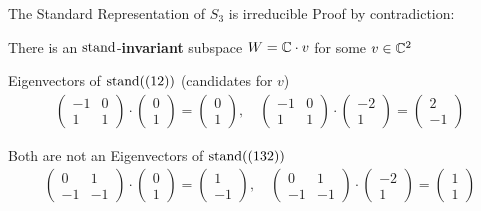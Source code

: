 \begin{frame}{The Standard Representation of $S_3$ is irreducible}
    \large
    Proof by contradiction:

    There is an $\operatorname{stand}$-\textbf{invariant} subspace $W = \mathbb{C} \cdot v$ for some $v \in \mathbb{C}^2$

    \pause
    Eigenvectors of $\operatorname{stand}((12))$ (candidates for $v$)
    \begin{align*}
        \begin{pmatrix}
            -1 & 0 \\
            1 & 1
        \end{pmatrix} \cdot \begin{pmatrix}
            0 \\ 1
        \end{pmatrix} = \begin{pmatrix}
            0 \\ 1
        \end{pmatrix}, \quad \begin{pmatrix}
            -1 & 0 \\
            1 & 1
        \end{pmatrix} \cdot \begin{pmatrix}
            -2 \\ 1
        \end{pmatrix} = \begin{pmatrix}
            2 \\ -1
        \end{pmatrix}
    \end{align*}
    
    \pause
    Both are not an Eigenvectors of $\operatorname{stand}((132))$
    \begin{align*}
        \begin{pmatrix}
            0 & 1 \\
            -1 & -1
        \end{pmatrix} \cdot \begin{pmatrix}
            0 \\ 1
        \end{pmatrix} = \begin{pmatrix}
            1 \\ -1
        \end{pmatrix}, \quad \begin{pmatrix}
            0 & 1 \\
            -1 & -1
        \end{pmatrix} \cdot \begin{pmatrix}
            -2 \\ 1
        \end{pmatrix} = \begin{pmatrix}
            1 \\ 1
        \end{pmatrix}
    \end{align*}
\end{frame}


